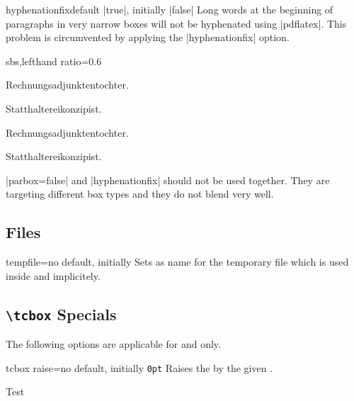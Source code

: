 \clearpage
\begin{docTcbKey}{hyphenationfix}{}{default |true|, initially |false|}
  Long words at the beginning of paragraphs in very narrow boxes
  will not be hyphenated using |pdflatex|. This problem is circumvented by
  applying the |hyphenationfix| option.

\begin{dispExample*}{sbs,lefthand ratio=0.6}

\begin{tcolorbox}
Rechnungsadjunktentochter.\par
Statthaltereikonzipist.
\end{tcolorbox}

\begin{tcolorbox}[hyphenationfix]
Rechnungsadjunktentochter.\par
Statthaltereikonzipist.
\end{tcolorbox}
\end{dispExample*}

\smallskip
\begin{marker}
|parbox=false| and |hyphenationfix| should not be used together. They are
targeting different box types and they do not blend very well.
\end{marker}
\end{docTcbKey}


\subsection{Files}
\begin{docTcbKey}{tempfile}{=}{no default, initially }
  Sets  as name for the temporary file which is used inside
   and  implicitely.
\end{docTcbKey}

\subsection{\texttt{\textbackslash tcbox} Specials}
The following options are applicable for  and 
only.

\begin{docTcbKey}{tcbox raise}{=}{no default, initially \texttt{0pt}}
  Raises the  by the given .
\begin{dispExample}

Test\dotfill
{}\dotfill
{}\dotfill
{}
\end{dispExample}
\end{docTcbKey}

